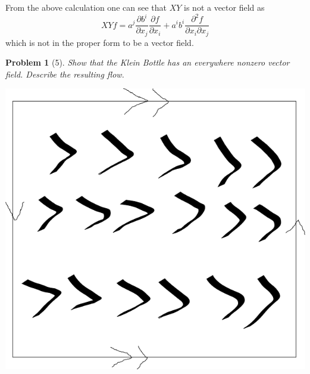 \documentclass[10pt]{article}
\theoremstyle{plain}
\newtheorem{problem}{Problem}
\theoremstyle{remark}
\begin{document}
From the above calculation one can see that $XY$ is not a vector field as
\[
  XYf = a^j\frac{\partial b^i}{\partial x_j}\frac{\partial f}{\partial x_i}+a^ib^i\frac{\partial^2 f}{\partial x_i\partial x_j}
\]
which is not in the proper form to be a vector field.

\pagebreak

\begin{problem}[5]
  Show that the Klein Bottle has an everywhere nonzero vector field.
  Describe the resulting flow.
\end{problem}

\begin{center}
  \includegraphics[scale=.5]{klein}  
\end{center}
\end{document}
